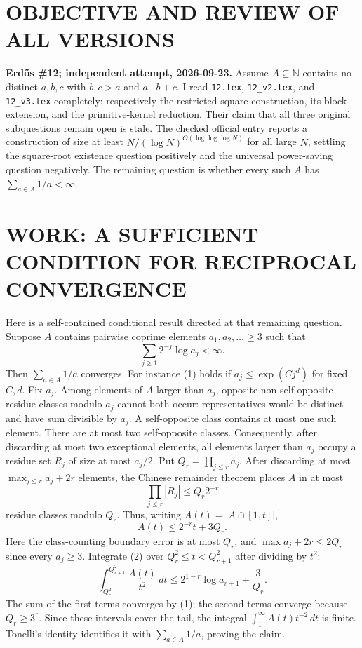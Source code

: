 \section{OBJECTIVE AND REVIEW OF ALL VERSIONS}
\textbf{Erd\H{o}s \#12; independent attempt, 2026-09-23.}
Assume $A\subseteq\mathbb N$ contains no distinct $a,b,c$ with $b,c>a$ and $a\mid b+c$. I read \texttt{12.tex}, \texttt{12\_v2.tex}, and \texttt{12\_v3.tex} completely: respectively the restricted square construction, its block extension, and the primitive-kernel reduction. Their claim that all three original subquestions remain open is stale. The checked official entry reports a construction of size at least $N/(\log N)^{O(\log\log\log N)}$ for all large $N$, settling the square-root existence question positively and the universal power-saving question negatively. The remaining question is whether every such $A$ has $\sum_{a\in A}1/a<\infty$.
\section{WORK: A SUFFICIENT CONDITION FOR RECIPROCAL CONVERGENCE}
Here is a self-contained conditional result directed at that remaining question. Suppose $A$ contains pairwise coprime elements $a_1,a_2,\ldots\ge3$ such that
\[
\sum_{j\ge1}2^{-j}\log a_j<\infty.
\tag{1}
\]
Then $\sum_{a\in A}1/a$ converges. For instance (1) holds if $a_j\le\exp(Cj^d)$ for fixed $C,d$.
Fix $a_j$. Among elements of $A$ larger than $a_j$, opposite non-self-opposite residue classes modulo $a_j$ cannot both occur: representatives would be distinct and have sum divisible by $a_j$. A self-opposite class contains at most one such element. There are at most two self-opposite classes. Consequently, after discarding at most two exceptional elements, all elements larger than $a_j$ occupy a residue set $R_j$ of size at most $a_j/2$.
Put $Q_r=\prod_{j\le r}a_j$. After discarding at most $\max_{j\le r}a_j+2r$ elements, the Chinese remainder theorem places $A$ in at most
\[
\prod_{j\le r}|R_j|\le Q_r2^{-r}
\]
residue classes modulo $Q_r$. Thus, writing $A(t)=|A\cap[1,t]|$,
\[
A(t)\le 2^{-r}t+3Q_r.
\tag{2}
\]
Here the class-counting boundary error is at most $Q_r$, and $\max a_j+2r\le2Q_r$ since every $a_j\ge3$.
Integrate (2) over $Q_r^2\le t<Q_{r+1}^2$ after dividing by $t^2$:
\[
\int_{Q_r^2}^{Q_{r+1}^2}\frac{A(t)}{t^2}\,dt
\le 2^{1-r}\log a_{r+1}+\frac3{Q_r}.
\]
The sum of the first terms converges by (1); the second terms converge because $Q_r\ge3^r$. Since these intervals cover the tail, the integral $\int_1^\infty A(t)t^{-2}\,dt$ is finite. Tonelli's identity identifies it with $\sum_{a\in A}1/a$, proving the claim.
